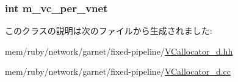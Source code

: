 \label{classVCallocator__d_a81d53a65b375007289068e764da769d8}
\hypertarget{classVCallocator__d_a2d66b8cad5144408ed492eeff4d37c2f}{
\subsubsection[{m\_\-vc\_\-per\_\-vnet}]{\setlength{\rightskip}{0pt plus 5cm}int {\bf m\_\-vc\_\-per\_\-vnet}}}
\label{classVCallocator__d_a2d66b8cad5144408ed492eeff4d37c2f}


このクラスの説明は次のファイルから生成されました:\begin{DoxyCompactItemize}
\item 
mem/ruby/network/garnet/fixed-\/pipeline/\hyperlink{VCallocator__d_8hh}{VCallocator\_\-d.hh}\item 
mem/ruby/network/garnet/fixed-\/pipeline/\hyperlink{VCallocator__d_8cc}{VCallocator\_\-d.cc}\end{DoxyCompactItemize}
